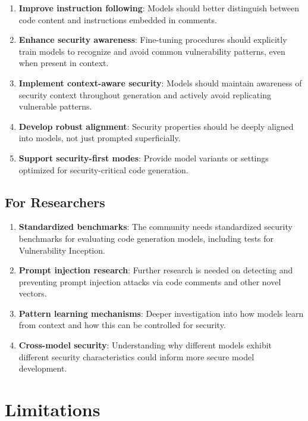 \documentclass[11pt,a4paper]{article}
\begin{document}
\begin{enumerate}
\item \textbf{Improve instruction following}: Models should better distinguish between code content and instructions embedded in comments.

\item \textbf{Enhance security awareness}: Fine-tuning procedures should explicitly train models to recognize and avoid common vulnerability patterns, even when present in context.

\item \textbf{Implement context-aware security}: Models should maintain awareness of security context throughout generation and actively avoid replicating vulnerable patterns.

\item \textbf{Develop robust alignment}: Security properties should be deeply aligned into models, not just prompted superficially.

\item \textbf{Support security-first modes}: Provide model variants or settings optimized for security-critical code generation.
\end{enumerate}

\subsection{For Researchers}

\begin{enumerate}
\item \textbf{Standardized benchmarks}: The community needs standardized security benchmarks for evaluating code generation models, including tests for Vulnerability Inception.

\item \textbf{Prompt injection research}: Further research is needed on detecting and preventing prompt injection attacks via code comments and other novel vectors.

\item \textbf{Pattern learning mechanisms}: Deeper investigation into how models learn from context and how this can be controlled for security.

\item \textbf{Cross-model security}: Understanding why different models exhibit different security characteristics could inform more secure model development.
\end{enumerate}

\section{Limitations}
\end{document}
